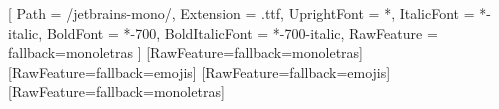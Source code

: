     \ifx\fuentemono\nombreJetBrains
      \setmonofont{jetbrains-mono}[
        Path           = {\carpetaFuentes/jetbrains-mono/},
        Extension      = .ttf,
        UprightFont    = *,
        ItalicFont     = *-italic,
        BoldFont       = *-700,
        BoldItalicFont = *-700-italic,
        RawFeature     = {fallback=monoletras}
      ]
    \else
      \setmonofont{\fuentemono}[RawFeature={fallback=monoletras}]
    \fi
  \else
    \setmainfont{\fuenteprincipal}[RawFeature={fallback=emojis}]
    \setsansfont{\fuentesans}[RawFeature={fallback=emojis}]
    \setmonofont{\fuentemono}[RawFeature={fallback=monoletras}]
  \fi
\else
  \ifdefined\setmainfont
    \setmainfont{\fuenteprincipal}
    \setsansfont{\fuentesans}
    \setmonofont{\fuentemono}
  \fi
\fi


%
%
%
\usepackage{enumitem}
\renewcommand{\tightlist}{}



